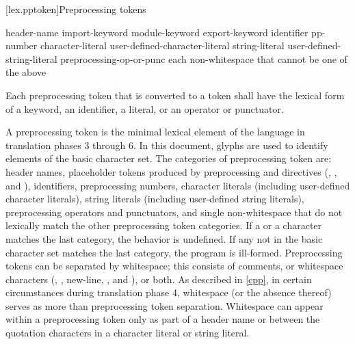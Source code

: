 \documentclass{wg21}
\begin{document}
[lex.pptoken]{Preprocessing tokens}

%
\begin{bnf}
    \br
    header-name\br
    import-keyword\br
    module-keyword\br
    export-keyword\br
    identifier\br
    pp-number\br
    character-literal\br
    user-defined-character-literal\br
    string-literal\br
    user-defined-string-literal\br
    preprocessing-op-or-punc\br
    \textnormal{each non-whitespace  that cannot be one of the above}
\end{bnf}

\pnum
Each preprocessing token that is converted to a token
shall have the lexical form of a keyword, an identifier, a literal,
or an operator or punctuator.

\pnum
A preprocessing token is the minimal lexical element of the language in translation
phases 3 through 6.
In this document,
glyphs are used to identify
elements of the basic character set.
The categories of preprocessing token are: header names,
placeholder tokens produced by preprocessing  and  directives
(, , and ),
identifiers, preprocessing numbers, character literals (including user-defined character
literals), string literals (including user-defined string literals), preprocessing
operators and punctuators, and single non-whitespace  that do not lexically
match the other preprocessing token categories.
If a  or a  character
matches the last category, the behavior is undefined.
If any  not in the basic character set matches the last category,
the program is ill-formed.
Preprocessing tokens can be separated by
%
whitespace;
%
this consists of comments, or whitespace characters
(,
,
new-line,
, and
), or both.
As described in \ref{cpp}, in certain
circumstances during translation phase 4, whitespace (or the absence
thereof) serves as more than preprocessing token separation. Whitespace
can appear within a preprocessing token only as part of a header name or
between the quotation characters in a character literal or
string literal.
\end{document}
